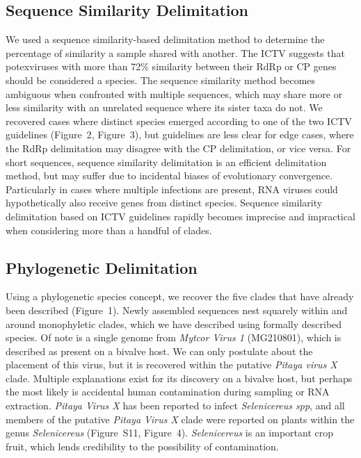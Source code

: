 \documentclass[fleqn,10pt,lineno]{wlpeerj}
\begin{document}
{\subsection*{Sequence Similarity Delimitation}
We used a sequence similarity-based delimitation method to determine the percentage of similarity a sample shared with another.
The ICTV suggests that potexviruses with more than 72\% similarity between their RdRp or CP genes should be considered a species.
The sequence similarity method becomes ambiguous when confronted with multiple sequences, which may share more or less similarity with an unrelated sequence where its sister taxa do not. 
We recovered cases where distinct species emerged according to one of the two ICTV guidelines ({Figure~2}, {Figure~3}), but guidelines are less clear for edge cases, where the RdRp delimitation may disagree with the CP delimitation, or vice versa.
For short sequences, sequence similarity delimitation is an efficient delimitation method, but may suffer due to incidental biases of evolutionary convergence.
Particularly in cases where multiple infections are present, RNA viruses could hypothetically also receive genes from distinct species.
Sequence similarity delimitation based on ICTV guidelines rapidly becomes imprecise and impractical when considering more than a handful of clades.

\subsection*{Phylogenetic Delimitation}
Using a phylogenetic species concept, we recover the five clades that have already been described ({Figure~1}).
Newly assembled sequences nest squarely within and around monophyletic clades, which we have described using formally described species. 
Of note is a single genome from \textit{Mytcor Virus 1} (MG210801), which is described as present on a bivalve host. 
We can only postulate about the placement of this virus, but it is recovered within the putative \textit{Pitaya virus X} clade.
Multiple explanations exist for its discovery on a bivalve host, but perhaps the most likely is accidental human contamination during sampling or RNA extraction.
\textit{Pitaya Virus X} has been reported to infect \textit{Selenicereus spp}, and all members of the putative \textit{Pitaya Virus X} clade were reported on plants within the genus \textit{Selenicereus} ({Figure~S11}, {Figure~4}).
\textit{Selenicereus} is an important crop fruit, which lends credibility to the possibility of contamination. 


}
\end{document}
